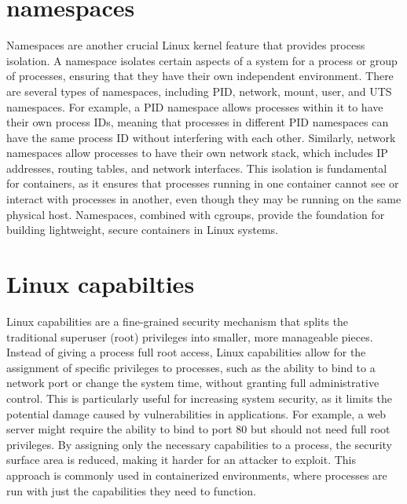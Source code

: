 \documentclass[12pt]{report}
\begin{document}
\begin{doublespace}
\section{namespaces}
Namespaces are another crucial Linux kernel feature that provides process isolation. A namespace isolates certain aspects of a system for a process or group of processes, ensuring that they have their own independent environment. There are several types of namespaces, including PID, network, mount, user, and UTS namespaces. For example, a PID namespace allows processes within it to have their own process IDs, meaning that processes in different PID namespaces can have the same process ID without interfering with each other. Similarly, network namespaces allow processes to have their own network stack, which includes IP addresses, routing tables, and network interfaces. This isolation is fundamental for containers, as it ensures that processes running in one container cannot see or interact with processes in another, even though they may be running on the same physical host. Namespaces, combined with cgroups, provide the foundation for building lightweight, secure containers in Linux systems.

\section{Linux capabilties}
Linux capabilities are a fine-grained security mechanism that splits the traditional superuser (root) privileges into smaller, more manageable pieces. Instead of giving a process full root access, Linux capabilities allow for the assignment of specific privileges to processes, such as the ability to bind to a network port or change the system time, without granting full administrative control. This is particularly useful for increasing system security, as it limits the potential damage caused by vulnerabilities in applications. For example, a web server might require the ability to bind to port 80 but should not need full root privileges. By assigning only the necessary capabilities to a process, the security surface area is reduced, making it harder for an attacker to exploit. This approach is commonly used in containerized environments, where processes are run with just the capabilities they need to function.


\end{doublespace}
\end{document}
